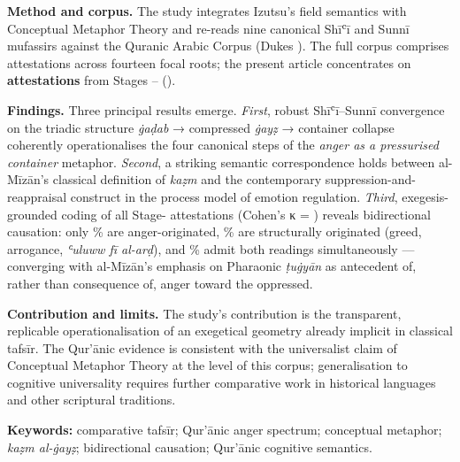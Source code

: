 \documentclass[12pt,a4paper]{article}
\newenvironment{englishabstract}
  {%
    \clearpage
    \begin{LTR}%
    \DefaultMathsDigits
    \englishbody
    \setstretch{1.25}%
    \setlength{\parindent}{0pt}%
    \setlength{\parskip}{0.6em plus 0.2em}%
  }%
  {\end{LTR}}
\begin{document}
\begin{englishabstract}
\noindent\textbf{Method and corpus.} The study integrates Izutsu’s field semantics with Conceptual Metaphor Theory and re-reads nine canonical Shīʿī and Sunnī mufassirs against the Quranic Arabic Corpus (Dukes ). The full corpus comprises  attestations across fourteen focal roots; the present article concentrates on \textbf{ attestations} from Stages – ().

\noindent\textbf{Findings.} Three principal results emerge. \textit{First}, robust Shīʿī–Sunnī convergence on the triadic structure \textit{ġaḍab} → compressed \textit{ġayẓ} → container collapse coherently operationalises the four canonical steps of the \textit{anger as a pressurised container} metaphor. \textit{Second}, a striking semantic correspondence holds between al-Mīzān’s classical definition of \textit{kaẓm} and the contemporary suppression-and-reappraisal construct in the process model of emotion regulation. \textit{Third}, exegesis-grounded coding of all  Stage- attestations (Cohen’s κ = ) reveals bidirectional causation: only \% are anger-originated, \% are structurally originated (greed, arrogance, \textit{ʿuluww fī al-arḍ}), and \% admit both readings simultaneously — converging with al-Mīzān’s emphasis on Pharaonic \textit{ṭuġyān} as antecedent of, rather than consequence of, anger toward the oppressed.

\noindent\textbf{Contribution and limits.} The study’s contribution is the transparent, replicable operationalisation of an exegetical geometry already implicit in classical tafsīr. The Qur’ānic evidence is consistent with the universalist claim of Conceptual Metaphor Theory at the level of this corpus; generalisation to cognitive universality requires further comparative work in historical languages and other scriptural traditions.

\vspace{4pt}

\noindent\textbf{Keywords:} comparative tafsīr; Qur’ānic anger spectrum; conceptual metaphor; \textit{kaẓm al-ġayẓ}; bidirectional causation; Qur’ānic cognitive semantics.

\end{englishabstract}
\end{document}
